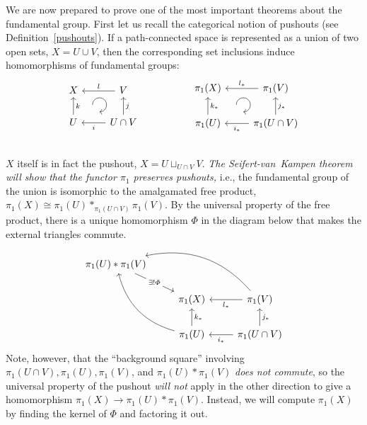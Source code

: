 We are now prepared to prove one of the most important theorems about the fundamental group. First let us recall the categorical notion of pushouts (see Definition~\ref{pushouts}). If a path-connected space is represented as a union of two open sets, $X=U\cup V$, then the corresponding set inclusions induce homomorphisms of fundamental groups:
\[
    \begin{tikzcd}[every matrix/.append style={name=m},   
    execute at end picture={\draw [<-] ([xshift=-8.5mm,yshift=1mm]m-2-2.north) arc[start angle=-90,delta angle=270,radius=0.25cm];}]
    X \arrow[r,leftarrow,"l"]\arrow[d,leftarrow,"k"]& V\arrow[d,leftarrow,"j"] \\
    U\arrow[r,,leftarrow,swap,"i"]& U\cap V\\
    \end{tikzcd}
    \quad\quad\quad\quad\quad
    \begin{tikzcd}[every matrix/.append style={name=m},   
    execute at end picture={\draw [<-] ([xshift=-11.5mm,yshift=1mm]m-2-2.north) arc[start angle=-90,delta angle=270,radius=0.25cm];}]
    \pi_1(X) \arrow[r,leftarrow,"l_\ast"]\arrow[d,leftarrow,"k_\ast"]& \pi_1(V)\arrow[d,leftarrow,"j_\ast"] \\
    \pi_1(U)\arrow[r,,leftarrow,swap,"i_\ast"]& \pi_1(U\cap V)\\
    \end{tikzcd}
\]
$X$ itself is in fact the pushout, $X=U\sqcup_{U\cap V}V$. \emph{The Seifert-van~Kampen theorem will show that the functor $\pi_1$ preserves pushouts,} i.e., the fundamental group of the union is isomorphic to the amalgamated free product, $\pi_1(X)\cong \pi_1(U) \ast_{\pi_1(U\cap V)} \pi_1(V)$. By the universal property of the free product, there is a unique homomorphism $\varPhi$ in the diagram below that makes the external triangles commute.
\[
    \begin{tikzcd}
    \pi_1(U)\ast \pi_1(V)   \arrow[drr,leftarrow, bend left]   \arrow[ddr,leftarrow, bend right]   \arrow[dr,"\exists! \varPhi" description] & & \\
        & \pi_1(X) \arrow[r,leftarrow,swap, "l_\ast"] \arrow[d,leftarrow, "k_\ast"]       & \pi_1(V) \arrow[d,leftarrow, "j_\ast"] \\ & \pi_1(U) \arrow[r,leftarrow,swap, "i_\ast"] &\pi_1(U\cap V) 
    \end{tikzcd}
\]
Note, however, that the ``background square'' involving $\pi_1(U\cap V),\pi_1(U),\pi_1(V)$, and $\pi_1(U)\ast \pi_1(V)$ \emph{does not commute}, so the universal property of the pushout \emph{will not} apply in the other direction to give a homomorphism $\pi_1(X)\to \pi_1(U)\ast\pi_1(V)$. Instead, we will compute $\pi_1(X)$ by finding the kernel of $\varPhi$ and factoring it out.

